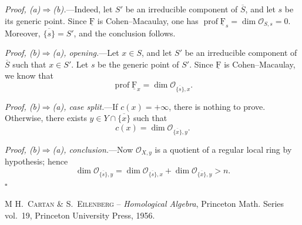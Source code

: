 \documentclass[10pt,a4paper]{article}
\newcommand{\uF}{\underline{\mathrm F}}
\newcommand{\cF}{\uF}
\newcommand{\cO}{\mathcal O}
\newcommand{\prof}{\operatorname{prof}}
\theoremstyle{sgatheorem}
\theoremstyle{plain}
\numberwithin{equation}{section}
\begin{document}

\medskip
\noindent\textit{Proof, \textup{(a)}$\Rightarrow$\textup{(b)}.}---Indeed,
let $S'$ be an irreducible component of $\overline S$, and let $s$ be its
generic point. Since $\cF$ is Cohen--Macaulay, one has
$\prof \cF_s=\dim\cO_{S,s}=0$. Moreover, $\overline{\{s\}}=S'$, and the
conclusion follows.


\medskip
\noindent\textit{Proof, \textup{(b)}$\Rightarrow$\textup{(a)}, opening.}---Let
$x\in S$, and let $S'$ be an irreducible component of $\overline S$ such that
$x\in S'$. Let $s$ be the generic point of $S'$. Since $\cF$ is
Cohen--Macaulay, we know that
\[
  \prof \cF_x=\dim\cO_{\overline{\{s\}},x}.
\]

\medskip
\noindent\textit{Proof, \textup{(b)}$\Rightarrow$\textup{(a)}, case
split.}---If $c(x)=+\infty$, there is nothing to prove. Otherwise, there exists
$y\in Y\cap\overline{\{x\}}$ such that
\[
  c(x)=\dim\cO_{\overline{\{x\}},y}.
\]

\medskip
\noindent\textit{Proof, \textup{(b)}$\Rightarrow$\textup{(a)},
conclusion.}---Now $\cO_{X,y}$ is a quotient of a regular local ring by
hypothesis; hence
\[
  \dim\cO_{\overline{\{s\}},y}
  =\dim\cO_{\overline{\{s\}},x}
   +\dim\cO_{\overline{\{x\}},y}>n.
\]
\hfill$\square$


\begingroup

\renewcommand{\refname}{Bibliography}
\begin{thebibliography}{M}
\textsc{H.~Cartan \& S.~Eilenberg} -- \emph{Homological Algebra},
Princeton Math. Series vol.~19, Princeton University Press, 1956.
\end{thebibliography}

\endgroup

\end{document}
